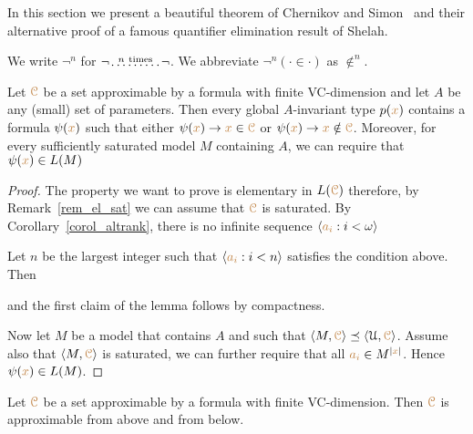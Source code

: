 \documentclass[creche.tex]{subfiles}
\begin{document}
In this section we present a beautiful theorem of Chernikov and Simon~\cite{CS} and their alternative proof of a famous quantifier elimination result of Shelah. 

We write \emph{$\neg^n$\/} for $\neg\!\stackrel{n\ \rm times}{\dots\dots\dots}\!\neg$. We abbreviate $\neg^n(\cdot\in\cdot)$ as \emph{$\notin^n$}.

\begin{lemma}\label{lem_honest}
Let ${\color{brown}\EuScript C}$ be a set approximable by a formula with finite VC-dimension and let $A$ be any (small) set of parameters. Then every global $A$-invariant type $p({\color{brown} x})$ contains a formula $\psi({\color{brown} x})$ such that either $\psi({\color{brown} x})\rightarrow {\color{brown}x}\in{\color{brown}\EuScript C}$ or $\psi({\color{brown} x})\rightarrow {\color{brown}x}\notin{\color{brown}\EuScript C}$. Moreover, for every sufficiently saturated model $M$ containing $A$, we can require that $\psi({\color{brown} x})\in L(M)$
\end{lemma}

\begin{proof}
The property we want to prove is elementary in $L({\color{brown}\EuScript C})$ therefore, by Remark~\ref{rem_el_sat} we can assume that ${\color{brown}\EuScript C}$ is saturated. By Corollary~\ref{corol_altrank}, there is no infinite sequence $\langle{\color{brown}a_i}:i<\omega\rangle$


Let $n$ be the largest integer such that $\langle{\color{brown}a_i}:i<n\rangle$ satisfies the condition above. Then


and the first claim of the lemma follows by compactness. 

Now let $M$ be a model that contains $A$ and such that $\langle M,{\color{brown}\EuScript C}\rangle\preceq\langle\EuScript U,{\color{brown}\EuScript C}\rangle$. Assume also that $\langle M,{\color{brown}\EuScript C}\rangle$ is saturated, we can further require that all ${\color{brown} a_i}\in M^{|{\color{brown} x}|}$. Hence $\psi({\color{brown} x})\in L(M)$.
\end{proof}

\begin{theorem}\label{thm_honest}
Let ${\color{brown}\EuScript C}$ be a set approximable by a formula with finite VC-dimension. Then ${\color{brown}\EuScript C}$ is approximable from above and from below.
\end{theorem}
\end{document}
